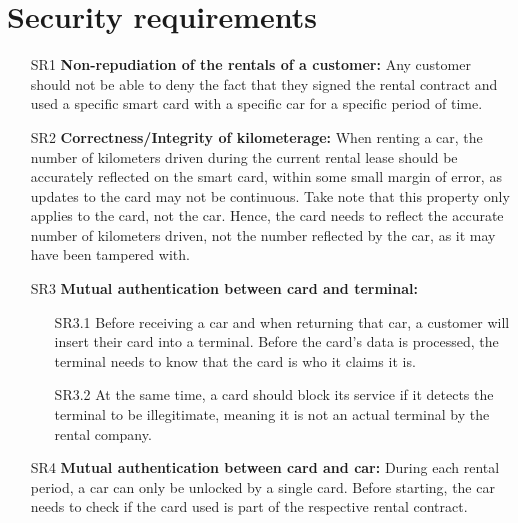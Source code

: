 \documentclass[a4paper]{article}
\begin{document}
\section{Security requirements}
\label{sr}
\begin{enumerate}
    \item[SR1] \textbf{Non-repudiation of the rentals of a customer:} Any customer should not be able to deny the fact that they signed the rental contract and used a specific smart card with a specific car for a specific period of time.
    \item[SR2] \textbf{Correctness/Integrity of kilometerage:} When renting a car, the number of kilometers driven during the current rental lease should be accurately reflected on the smart card, within some small margin of error, as updates to the card may not be continuous. Take note that this property only applies to the card, not the car. Hence, the card needs to reflect the accurate number of kilometers driven, not the number reflected by the car, as it may have been tampered with.
    \item[SR3] \textbf{Mutual authentication between card and terminal:}
    \begin{enumerate}
        \item[SR3.1] Before receiving a car and when returning that car, a customer will insert their card into a terminal. Before the card's data is processed, the terminal needs to know that the card is who it claims it is.
        \item[SR3.2] At the same time, a card should block its service if it detects the terminal to be illegitimate, meaning it is not an actual terminal by the rental company.
    \end{enumerate} 
    \item[SR4] \textbf{Mutual authentication between card and car:} During each rental period, a car can only be unlocked by a single card. Before starting, the car needs to check if the card used is part of the respective rental contract. 
\end{enumerate}

\end{document}
